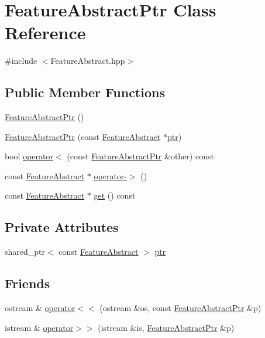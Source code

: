 \hypertarget{class_feature_abstract_ptr}{\section{Feature\+Abstract\+Ptr Class Reference}
\label{class_feature_abstract_ptr}
}


{\ttfamily \#include $<$Feature\+Abstract.\+hpp$>$}

\subsection*{Public Member Functions}
\begin{DoxyCompactItemize}
\item 
\hyperlink{class_feature_abstract_ptr_ad8e4b3405595aa5b3a0be5a637641af9}{Feature\+Abstract\+Ptr} ()
\item 
\hyperlink{class_feature_abstract_ptr_a9f4d3419f8b31eda120231b3ba602024}{Feature\+Abstract\+Ptr} (const \hyperlink{class_feature_abstract}{Feature\+Abstract} $\ast$\hyperlink{class_feature_abstract_ptr_aa9666a4ac64a4e9d8c5778843cbb7b2a}{ptr})
\item 
bool \hyperlink{class_feature_abstract_ptr_a2028ab1a7cb76de94fa43bbec3b60198}{operator$<$} (const \hyperlink{class_feature_abstract_ptr}{Feature\+Abstract\+Ptr} \&other) const 
\item 
const \hyperlink{class_feature_abstract}{Feature\+Abstract} $\ast$ \hyperlink{class_feature_abstract_ptr_ab893b5b38bb9cc06cd31623dc5694def}{operator-\/$>$} ()
\item 
const \hyperlink{class_feature_abstract}{Feature\+Abstract} $\ast$ \hyperlink{class_feature_abstract_ptr_a3ea5d2208aa59faa793c5c9a664fb96a}{get} () const 
\end{DoxyCompactItemize}
\subsection*{Private Attributes}
\begin{DoxyCompactItemize}
\item 
shared\+\_\+ptr$<$ const \hyperlink{class_feature_abstract}{Feature\+Abstract} $>$ \hyperlink{class_feature_abstract_ptr_aa9666a4ac64a4e9d8c5778843cbb7b2a}{ptr}
\end{DoxyCompactItemize}
\subsection*{Friends}
\begin{DoxyCompactItemize}
\item 
ostream \& \hyperlink{class_feature_abstract_ptr_aed8fa13e89e72d721eb74a35a53e8814}{operator$<$$<$} (ostream \&os, const \hyperlink{class_feature_abstract_ptr}{Feature\+Abstract\+Ptr} \&p)
\item 
istream \& \hyperlink{class_feature_abstract_ptr_a5e97ab964d53de51937247cd6691eca5}{operator$>$$>$} (istream \&is, \hyperlink{class_feature_abstract_ptr}{Feature\+Abstract\+Ptr} \&p)
\end{DoxyCompactItemize}



